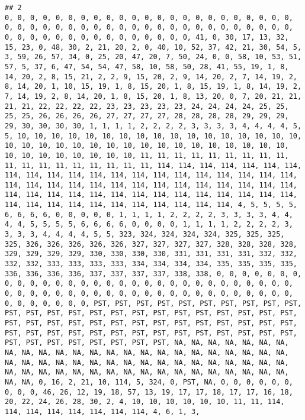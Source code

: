 \documentclass[]{article}
\begin{document}
\begin{verbatim}
## 2                                                                                                                                                                                                                                                                                                                                                                                                                                                                                                           0, 0, 0, 0, 0, 0, 0, 0, 0, 0, 0, 0, 0, 0, 0, 0, 0, 0, 0, 0, 0, 0, 0, 0, 0, 0, 0, 0, 0, 0, 0, 0, 0, 0, 0, 0, 0, 0, 0, 0, 0, 0, 0, 0, 0, 0, 0, 0, 0, 0, 0, 0, 0, 0, 0, 0, 0, 0, 0, 0, 0, 41, 0, 30, 17, 13, 32, 15, 23, 0, 48, 30, 2, 21, 20, 2, 0, 40, 10, 52, 37, 42, 21, 30, 54, 5, 3, 59, 26, 57, 34, 0, 25, 20, 47, 20, 7, 50, 24, 0, 0, 58, 10, 53, 51, 57, 5, 37, 6, 47, 54, 54, 47, 58, 10, 58, 50, 28, 41, 55, 19, 1, 8, 14, 20, 2, 8, 15, 21, 2, 2, 9, 15, 20, 2, 9, 14, 20, 2, 7, 14, 19, 2, 8, 14, 20, 1, 10, 15, 19, 1, 8, 15, 20, 1, 8, 15, 19, 1, 8, 14, 19, 2, 7, 14, 19, 2, 8, 14, 20, 1, 8, 15, 20, 1, 8, 13, 20, 0, 7, 20, 21, 21, 21, 21, 22, 22, 22, 22, 23, 23, 23, 23, 23, 24, 24, 24, 24, 25, 25, 25, 25, 26, 26, 26, 26, 27, 27, 27, 27, 28, 28, 28, 28, 29, 29, 29, 29, 30, 30, 30, 30, 1, 1, 1, 1, 2, 2, 2, 2, 3, 3, 3, 3, 4, 4, 4, 4, 5, 5, 10, 10, 10, 10, 10, 10, 10, 10, 10, 10, 10, 10, 10, 10, 10, 10, 10, 10, 10, 10, 10, 10, 10, 10, 10, 10, 10, 10, 10, 10, 10, 10, 10, 10, 10, 10, 10, 10, 10, 10, 10, 10, 11, 11, 11, 11, 11, 11, 11, 11, 11, 11, 11, 11, 11, 11, 11, 11, 11, 11, 114, 114, 114, 114, 114, 114, 114, 114, 114, 114, 114, 114, 114, 114, 114, 114, 114, 114, 114, 114, 114, 114, 114, 114, 114, 114, 114, 114, 114, 114, 114, 114, 114, 114, 114, 114, 114, 114, 114, 114, 114, 114, 114, 114, 114, 114, 114, 114, 114, 114, 114, 114, 114, 114, 114, 114, 114, 114, 114, 114, 4, 5, 5, 5, 5, 6, 6, 6, 6, 0, 0, 0, 0, 0, 1, 1, 1, 1, 2, 2, 2, 2, 3, 3, 3, 3, 4, 4, 4, 4, 5, 5, 5, 5, 6, 6, 6, 6, 0, 0, 0, 0, 1, 1, 1, 1, 2, 2, 2, 2, 3, 3, 3, 3, 4, 4, 4, 4, 5, 5, 323, 324, 324, 324, 324, 325, 325, 325, 325, 326, 326, 326, 326, 326, 327, 327, 327, 327, 328, 328, 328, 328, 329, 329, 329, 329, 330, 330, 330, 330, 331, 331, 331, 331, 332, 332, 332, 332, 333, 333, 333, 333, 334, 334, 334, 334, 335, 335, 335, 335, 336, 336, 336, 336, 337, 337, 337, 337, 338, 338, 0, 0, 0, 0, 0, 0, 0, 0, 0, 0, 0, 0, 0, 0, 0, 0, 0, 0, 0, 0, 0, 0, 0, 0, 0, 0, 0, 0, 0, 0, 0, 0, 0, 0, 0, 0, 0, 0, 0, 0, 0, 0, 0, 0, 0, 0, 0, 0, 0, 0, 0, 0, 0, 0, 0, 0, 0, 0, 0, 0, PST, PST, PST, PST, PST, PST, PST, PST, PST, PST, PST, PST, PST, PST, PST, PST, PST, PST, PST, PST, PST, PST, PST, PST, PST, PST, PST, PST, PST, PST, PST, PST, PST, PST, PST, PST, PST, PST, PST, PST, PST, PST, PST, PST, PST, PST, PST, PST, PST, PST, PST, PST, PST, PST, PST, PST, PST, PST, PST, PST, NA, NA, NA, NA, NA, NA, NA, NA, NA, NA, NA, NA, NA, NA, NA, NA, NA, NA, NA, NA, NA, NA, NA, NA, NA, NA, NA, NA, NA, NA, NA, NA, NA, NA, NA, NA, NA, NA, NA, NA, NA, NA, NA, NA, NA, NA, NA, NA, NA, NA, NA, NA, NA, NA, NA, NA, NA, NA, NA, NA, 0, 16, 2, 21, 10, 114, 5, 324, 0, PST, NA, 0, 0, 0, 0, 0, 0, 0, 0, 0, 46, 26, 12, 19, 18, 57, 13, 19, 17, 17, 18, 17, 17, 16, 18, 20, 22, 24, 26, 28, 30, 2, 4, 10, 10, 10, 10, 10, 10, 11, 11, 114, 114, 114, 114, 114, 114, 114, 114, 4, 6, 1, 3, 
\end{verbatim}
\end{document}
